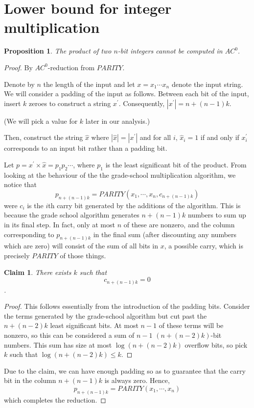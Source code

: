\documentclass[letterpaper,11pt]{article}
\newtheorem{proposition}{Proposition}
\newtheorem{claim}{Claim}
\begin{document}
\section*{Lower bound for integer multiplication}

\begin{proposition}
    The product of two $n$-bit integers cannot be computed in $AC^0$.
\end{proposition}

\begin{proof}
    By $AC^0$-reduction from $PARITY$.

    Denote by $n$ the length of the input and let $x = x_1 \cdots x_n$ denote
    the input string.  We will consider a padding of the input as follows.
    Between each bit of the input, insert $k$ zeroes to construct a string
    $x^\prime$. Consequently, $|x^\prime| = n + (n-1){k}$.

    (We will pick a value for $k$ later in our analysis.)

    Then, construct the string $\hat x$ where $|\hat x| = |x^\prime|$ and for
    all $i$, $\hat x_i = 1$ if and only if $x^\prime_i$ corresponds to an input
    bit rather than a padding bit.

    Let $p = x^\prime \times {\hat x} = p_1 p_2 \cdots$, where $p_1$ is the
    least significant bit of the product. From looking at the behaviour of the
    the grade-school multiplication algorithm, we notice that
    $$
    p_{n + (n-1)k} = PARITY(x_1, \cdots, x_n, c_{n + (n-1)k})
    $$
    were $c_i$ is the $i$th carry bit generated by the additions of the
    algorithm. This is because the grade school algorithm generates $n +
    (n-1)k$ numbers to sum up in its final step. In fact, only at most $n$ of
    these are nonzero, and the column corresponding to $p_{n + (n-1)k}$ in the
    final sum (after discounting any numbers which are zero) will consist of
    the sum of all bits in $x$, a possible carry, which is precisely $PARITY$
    of those things.

    \begin{claim}
        There exists $k$ such that $$c_{n + (n-1)k} = 0$$.
    \end{claim}

    \begin{proof}
        This follows essentially from the introduction of the padding bits.
        Consider the terms generated by the grade-school algorithm but cut past
        the $n + (n-2)k$ least significant bits. At most $n - 1$ of these
        terms will be nonzero, so this can be considered a sum of $n - 1$
        $(n + (n-2)k)$-bit numbers. This sum has size at most
        $\log{(n + (n-2)k)}$ overflow bits, so pick $k$ such that
        $\log{(n + (n-2)k)} \leq k$.
    \end{proof}

    Due to the claim, we can have enough padding so as to guarantee that the
    carry bit in the column $n + (n-1)k$ is always zero. Hence,
    $$
    p_{n + (n-1)k} = PARITY(x_1, \cdots, x_n)
    $$
    which completes the reduction.
\end{proof}
\end{document}
